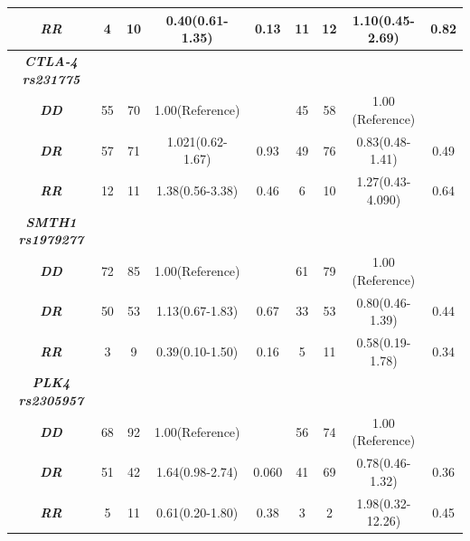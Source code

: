 \documentclass[journal,article,submit,moreauthors,pdftex]{Definitions/mdpi}
\begin{document}
\begin{table}[H]
{\begin{tabular}{ccccccccc}
\textit{\textbf{RR}}         & 4  & 10 & 0.40(0.61-1.35)   & 0.13  & 11 & 12 & 1.10(0.45-2.69)  & 0.82 \\ \hline
\textit{\textbf{CTLA-4 rs231775}}   &    &    &                   &       &    &    &                  &      \\ \hline
\textit{\textbf{DD}}         & 55 & 70 & 1.00(Reference)   &       & 45 & 58 & 1.00 (Reference) &      \\ \hline
\textit{\textbf{DR}}         & 57 & 71 & 1.021(0.62-1.67)  & 0.93  & 49 & 76 & 0.83(0.48-1.41)  & 0.49 \\ \hline
\textit{\textbf{RR}}         & 12 & 11 & 1.38(0.56-3.38)   & 0.46  & 6  & 10 & 1.27(0.43-4.090) & 0.64 \\ \hline
\textit{\textbf{SMTH1 rs1979277}}   &    &    &                   &       &    &    &                  &      \\ \hline
\textit{\textbf{DD}}         & 72 & 85 & 1.00(Reference)   &       & 61 & 79 & 1.00 (Reference) &      \\ \hline
\textit{\textbf{DR}}         & 50 & 53 & 1.13(0.67-1.83)   & 0.67  & 33 & 53 & 0.80(0.46-1.39)  & 0.44 \\ \hline
\textit{\textbf{RR}}         & 3  & 9  & 0.39(0.10-1.50)   & 0.16  & 5  & 11 & 0.58(0.19-1.78)  & 0.34 \\ \hline
\textit{\textbf{PLK4 rs2305957}}  &    &    &                   &       &    &    &                  &      \\ \hline
\textit{\textbf{DD}}         & 68 & 92 & 1.00(Reference)   &       & 56 & 74 & 1.00 (Reference) &      \\ \hline
\textit{\textbf{DR}}         & 51 & 42 & 1.64(0.98-2.74)   & 0.060 & 41 & 69 & 0.78(0.46-1.32)  & 0.36 \\ \hline
\textit{\textbf{RR}}         & 5  & 11 & 0.61(0.20-1.80)   & 0.38  & 3  & 2  & 1.98(0.32-12.26) & 0.45
\end{tabular}%
}
\label{tab:Model genetic analysis in WBC and CV}
\end{table}


\begin{table}[H]
\caption{Normality test for LINE-1 methylation of RPL and VTP of WBC and CV}
\centering
{}
\label{tab:Normality test}
\end{table} 
\end{document}
